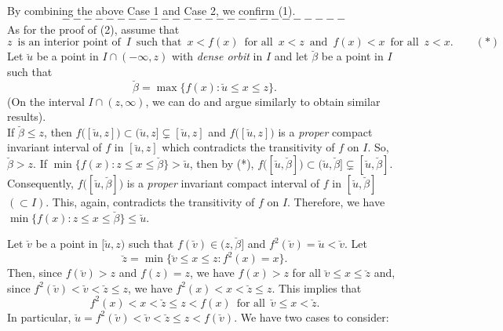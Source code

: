 \documentclass[12pt]{article}
\begin{document}
By combining the above Case 1 and Case 2, we confirm (1).   
$$--------------------------$$
\indent As for the proof of (2), assume that
$$
z \,\,\, \text{is an interior point of} \,\,\, I \,\,\, \text{such that} \,\,\, x < f(x) \,\,\, \text{for all} \,\,\, x < z \,\,\, \text{and} \,\,\, f(x) < x \,\,\, \text{for all} \,\,\, z < x.\qquad (*)
$$
\indent Let $\breve u$ be a point in $I \cap (-\infty, z)$ with {\it dense orbit} in $I$ and let $\breve \beta$ be a point in $I$ such that 
$$
\breve \beta = \max \big\{ f(x) : \breve u \le x \le z \big\}.
$$  
\big(On the interval $I \cap (z, \infty)$, we can do and argue similarly to obtain similar results\big). \\ If $\breve \beta \le z$, then $f\bigl([\breve u, z]\big) \subset (\breve u, z] \subsetneq [\breve u, z]$ and $f\big([\breve u, z]\big)$ is a {\it proper} compact invariant interval of $f$ in $[\breve u, z]$ which contradicts the transitivity of $f$ on $I$.  So, $\breve \beta > z$.  If $\min \big\{ f(x) : z \le x \le \breve \beta \big\} > \breve u$, then by (*), $f\big([\breve u, \breve \beta]\big) \subset (\breve u, \breve \beta] \subsetneq [\breve u, \breve \beta]$.  Consequently, $f\big([\breve u, \breve \beta]\big)$ is a {\it proper} invariant compact interval of $f$ in $[\breve u, \breve \beta]$ $(\subset I)$.  This, again, contradicts the transitivity of $f$ on $I$.  Therefore, we have $\min \big\{ f(x) : z \le x \le \breve \beta \big\} \le \breve u$.  

Let $\breve v$ be a point in $[\breve u, z)$ such that $f(\breve v) \in (z, \breve \beta]$ and $f^2(\breve v) = \breve u < \breve v$.  Let $$\breve z = \min \big\{ \breve v \le x \le z : f^2(x) = x \big\}.$$  Then, since $f(\breve v) > z$ and $f(z) = z$, we have $f(x) > z$ for all $\breve v \le x \le \breve z$ and, since 
$f^2(\breve v) < \breve v < \breve z \le z$, we have $f^2(x) < x < \breve z \le z$.  This implies that 
$$
f^2(x) < x < \breve z \le z < f(x) \,\,\, \text{for all} \,\,\, \breve v \le x < \breve z.
$$  
In particular, $\breve u = f^2(\breve v) < \breve v < \breve z \le z < f(\breve v)$.  We have two cases to consider:
\end{document}
